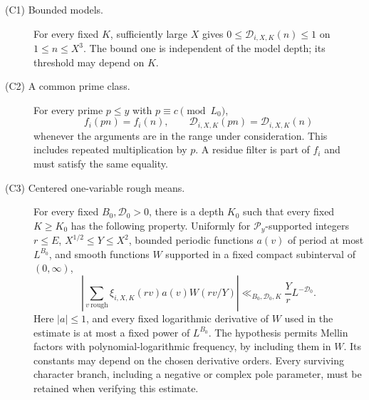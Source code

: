 \begin{description}
\item[\textup{(C1)} Bounded models.]
For every fixed \(K\), sufficiently large \(X\) gives
\(0\le \mathcal D_{i,X,K}(n)\le1\) on \(1\le n\le X^3\).
The bound one is independent of the model depth; its threshold
may depend on \(K\).

\item[\textup{(C2)} A common prime class.]
For every prime \(p\le y\) with \(p\equiv c\pmod{L_0}\),
\[
 f_i(pn)=f_i(n),\qquad \mathcal D_{i,X,K}(pn)=\mathcal D_{i,X,K}(n)
\]
whenever the arguments are in the range under consideration.
This includes repeated multiplication by \(p\). A residue filter
is part of \(f_i\) and must satisfy the same equality.

\item[\textup{(C3)} Centered one-variable rough means.]
For every fixed \(B_0,\mathcal D_0>0\), there is a depth \(K_0\) such that
every fixed \(K\ge K_0\) has the following property. Uniformly for
\(\mathcal P_y\)-supported integers \(r\le E\),
\(X^{1/2}\le Y\le X^2\), bounded periodic functions \(a(v)\)
of period at most \(L^{B_0}\), and smooth functions \(W\) supported
in a fixed compact subinterval of \((0,\infty)\),
\begin{equation}\label{eq:comparison-rough-means}
 \left|\sum_{v\ {\mathrm{rough}}}
       \xi_{i,X,K}(rv)a(v)W(rv/Y)\right|
                       \ll_{B_0,\mathcal D_0,K}\frac Yr L^{-\mathcal D_0}.
\end{equation}
Here \(|a|\le1\), and every fixed logarithmic derivative of \(W\)
used in the estimate is at most a fixed power of \(L^{B_0}\).
The hypothesis permits Mellin factors with polynomial-logarithmic
frequency, by including them in \(W\). Its constants may depend on
the chosen derivative orders. Every surviving character branch,
including a negative or complex pole parameter, must be retained
when verifying this estimate.


\end{description}
